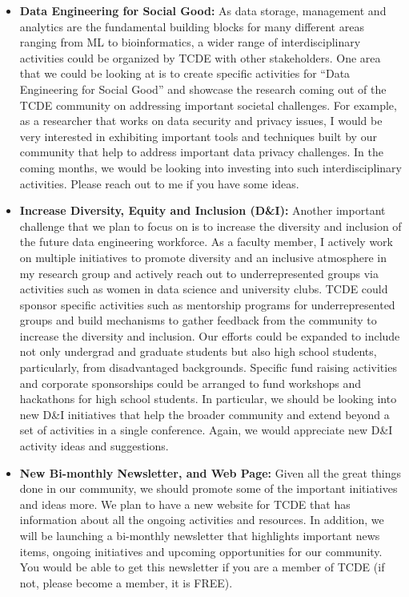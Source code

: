 \documentclass{article}
\begin{document}
\begin{itemize}
\item \textbf{Data Engineering for Social Good:} As data storage, management and analytics are the fundamental building blocks for many different areas ranging from ML to bioinformatics, a wider range of interdisciplinary activities could be organized by TCDE with other stakeholders. One area that we could be looking at is to create specific activities for “Data Engineering for Social Good” and showcase the research coming out of the TCDE community on addressing important societal challenges. For example, as a researcher that works on data security and privacy issues,  I would be very interested in exhibiting important tools and techniques built by our community that help to address important data privacy challenges. In the coming months, we would be looking into investing into such interdisciplinary activities. Please reach out to me if you have some ideas.

\item \textbf{Increase Diversity, Equity and Inclusion (D\&I):} Another important challenge that we plan to focus on is to increase the diversity and inclusion of the future data engineering workforce. As a faculty member, I actively work on multiple initiatives to promote diversity and an inclusive atmosphere in my research group and actively reach out to underrepresented groups via activities such as women in data science and university clubs. TCDE could sponsor specific activities such as mentorship programs for underrepresented groups and build mechanisms to gather feedback from the community to increase the diversity and inclusion. Our efforts could be expanded to include not only undergrad and graduate students but also high school students, particularly, from disadvantaged backgrounds. Specific fund raising activities and corporate sponsorships could be arranged to fund workshops and hackathons for high school students. In particular, we should be looking into new D\&I initiatives that help the broader community and extend beyond a set of activities in a single conference. Again, we would appreciate new D\&I activity ideas and suggestions.

\item \textbf{New Bi-monthly Newsletter, and Web Page:} Given all the great things done in our community,  we should promote some of the important initiatives and ideas more. We plan to have a new website for TCDE that has information about all the ongoing activities and resources. In addition, we will be launching a bi-monthly newsletter that highlights important news items, ongoing initiatives and upcoming opportunities for our community. You would be able to get this newsletter if you are a member of TCDE (if not, please become a member, it is FREE).
\end{itemize}
\end{document}
